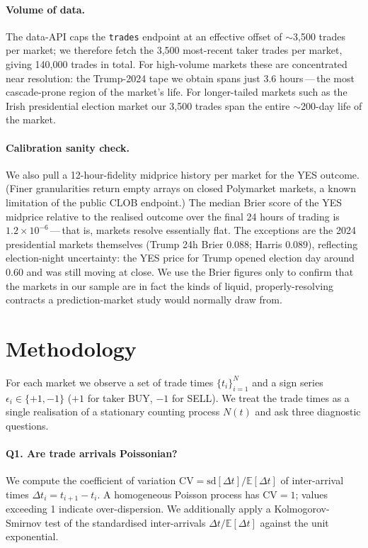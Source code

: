 \documentclass{article}
\begin{document}
\paragraph{Volume of data.} The data-API caps the
\texttt{trades} endpoint at an effective offset of $\sim$3,500 trades
per market; we therefore fetch the 3,500 most-recent taker trades per
market, giving 140,000 trades in total. For high-volume markets these
are concentrated near resolution: the Trump-2024 tape we obtain spans
just $3.6$ hours\,---\,the most cascade-prone region of the market's
life. For longer-tailed markets such as the Irish presidential
election market our 3,500 trades span the entire $\sim$200-day
life of the market.

\paragraph{Calibration sanity check.} We also pull a 12-hour-fidelity
midprice history per market for the YES outcome. (Finer granularities
return empty arrays on closed Polymarket markets, a known limitation of
the public CLOB endpoint.) The median Brier score of the YES midprice
relative to the realised outcome over the final 24 hours of trading is
$1.2\!\times\!10^{-6}$\,---\,that is, markets resolve essentially
flat. The exceptions are the 2024 presidential markets themselves
(Trump 24h Brier $0.088$; Harris $0.089$), reflecting election-night
uncertainty: the YES price for Trump opened election day around
0.60 and was still moving at close. We use the Brier figures only to
confirm that the markets in our sample are in fact the kinds of liquid,
properly-resolving contracts a prediction-market study would normally
draw from.

\section{Methodology}\label{sec:methodology}

For each market we observe a set of trade times $\{t_i\}_{i=1}^N$ and a
sign series $\epsilon_i\in\{+1,-1\}$ ($+1$ for taker BUY, $-1$ for
SELL). We treat the trade times as a single realisation of a stationary
counting process $N(t)$ and ask three diagnostic questions.

\paragraph{Q1. Are trade arrivals Poissonian?}  We compute the
coefficient of variation $\mathrm{CV}=\mathrm{sd}[\Delta t]/\mathbb{E}[\Delta
t]$ of inter-arrival times $\Delta t_i = t_{i+1}-t_i$. A homogeneous
Poisson process has $\mathrm{CV}=1$; values exceeding 1 indicate
over-dispersion. We additionally apply a Kolmogorov-Smirnov test of the
standardised inter-arrivals $\Delta t / \mathbb{E}[\Delta t]$ against
the unit exponential.
\end{document}
